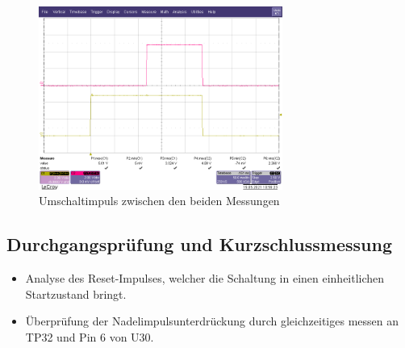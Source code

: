 \begin{figure}[htb]
    \centering
    \begin{minipage}[t]{0.45\linewidth}
        \centering
        \includegraphics[width=8cm]{Bilder/ASwitch-Umschaltung.png}
        \caption{Umschaltimpuls zwischen den beiden Messungen}
    \end{minipage}%
\end{figure}


\newpage
\subsection{Durchgangsprüfung und Kurzschlussmessung}


\begin{itemize}
	\item{Analyse des Reset-Impulses, welcher die Schaltung in einen einheitlichen Startzustand bringt.}
	
	\item{Überprüfung der Nadelimpulsunterdrückung durch gleichzeitiges messen an TP32 und Pin 6 von U30.}
\end{itemize}


